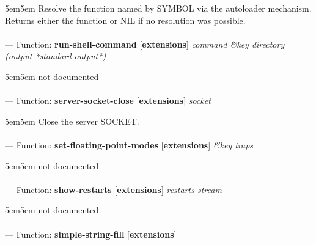 \begin{adjustwidth}{5em}{5em}
Resolve the function named by SYMBOL via the autoloader mechanism.
Returns either the function or NIL if no resolution was possible.
\end{adjustwidth}

\paragraph{}
\label{EXTENSIONS:RUN-SHELL-COMMAND}
--- Function: \textbf{run-shell-command} [\textbf{extensions}] \textit{command \&key directory (output *standard-output*)}

\begin{adjustwidth}{5em}{5em}
not-documented
\end{adjustwidth}

\paragraph{}
\label{EXTENSIONS:SERVER-SOCKET-CLOSE}
--- Function: \textbf{server-socket-close} [\textbf{extensions}] \textit{socket}

\begin{adjustwidth}{5em}{5em}
Close the server SOCKET.
\end{adjustwidth}

\paragraph{}
\label{EXTENSIONS:SET-FLOATING-POINT-MODES}
--- Function: \textbf{set-floating-point-modes} [\textbf{extensions}] \textit{\&key traps}

\begin{adjustwidth}{5em}{5em}
not-documented
\end{adjustwidth}

\paragraph{}
\label{EXTENSIONS:SHOW-RESTARTS}
--- Function: \textbf{show-restarts} [\textbf{extensions}] \textit{restarts stream}

\begin{adjustwidth}{5em}{5em}
not-documented
\end{adjustwidth}

\paragraph{}
\label{EXTENSIONS:SIMPLE-STRING-FILL}
--- Function: \textbf{simple-string-fill} [\textbf{extensions}] \textit{}

